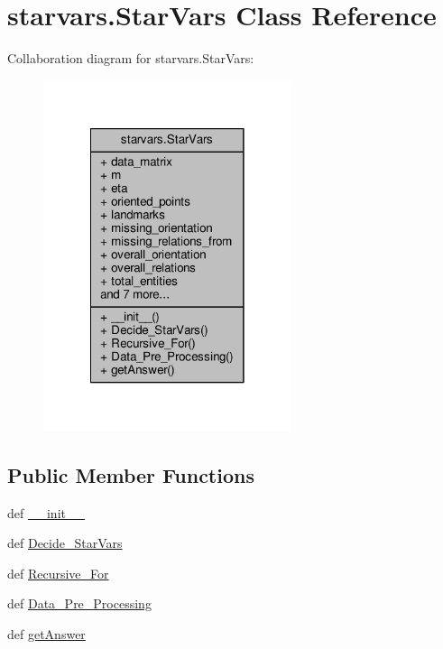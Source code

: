 \hypertarget{classstarvars_1_1StarVars}{\section{starvars.\-Star\-Vars Class Reference}
\label{classstarvars_1_1StarVars}
}


Collaboration diagram for starvars.\-Star\-Vars\-:\nopagebreak
\begin{figure}[H]
\begin{center}
\leavevmode
\includegraphics[width=206pt]{classstarvars_1_1StarVars__coll__graph}
\end{center}
\end{figure}
\subsection*{Public Member Functions}
\begin{DoxyCompactItemize}
\item 
def \hyperlink{classstarvars_1_1StarVars_a3394a0e46a1f5cb173821af6fbab07b7}{\-\_\-\-\_\-init\-\_\-\-\_\-}
\item 
def \hyperlink{classstarvars_1_1StarVars_af4960326446ecb6a19a5ae4809516a7f}{Decide\-\_\-\-Star\-Vars}
\item 
def \hyperlink{classstarvars_1_1StarVars_ad9148407d0cb17d568776803518cc611}{Recursive\-\_\-\-For}
\item 
def \hyperlink{classstarvars_1_1StarVars_adadc98f75e2ac694fc13fff32300c60f}{Data\-\_\-\-Pre\-\_\-\-Processing}
\item 
def \hyperlink{classstarvars_1_1StarVars_a28f4018d592ba55987d7e6a4d5bdf8e2}{get\-Answer}
\end{DoxyCompactItemize}
